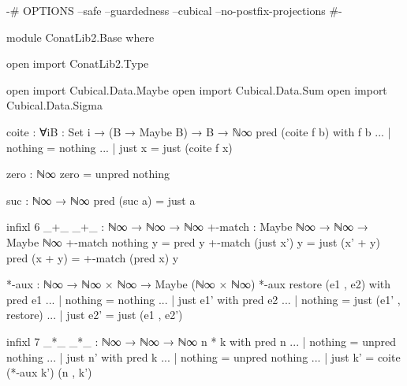 \begin{code}[hide]
{-# OPTIONS --safe --guardedness --cubical --no-postfix-projections #-}

module ConatLib2.Base where

open import ConatLib2.Type

open import Cubical.Data.Maybe
open import Cubical.Data.Sum
open import Cubical.Data.Sigma

coite : ∀{i}{B : Set i} → (B → Maybe B) → B → ℕ∞
pred (coite f b) with f b
... | nothing = nothing
... | just x  = just (coite f x)

zero : ℕ∞
zero = unpred nothing

suc : ℕ∞ → ℕ∞
pred (suc a) = just a

infixl 6 _+_
_+_ : ℕ∞ → ℕ∞ → ℕ∞
+-match : Maybe ℕ∞ → ℕ∞ → Maybe ℕ∞
+-match nothing    y = pred y
+-match (just x')  y = just (x' + y)
pred (x + y) = +-match (pred x) y

*-aux : ℕ∞ → ℕ∞ × ℕ∞ → Maybe (ℕ∞ × ℕ∞)
*-aux restore (e1 , e2) with pred e1
... | nothing = nothing
... | just e1' with pred e2
... | nothing = just (e1' , restore)
... | just e2' = just (e1 , e2')

infixl 7 _*_
_*_ : ℕ∞ → ℕ∞ → ℕ∞
n * k with pred n
... | nothing = unpred nothing
... | just n' with pred k
... | nothing = unpred nothing
... | just k' = coite (*-aux k') (n , k')
\end{code}

